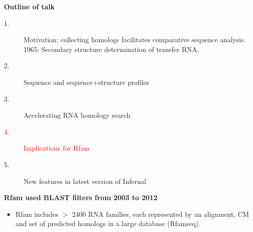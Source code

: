 \documentclass[landscape]{slides}
\begin{document}
\begin{slide}
\begin{center}
\textbf{Outline of talk}

\begin{description}
\item[1.] Motivation: collecting homologs facilitates comparative
  sequence analysis.\\ 1965: Secondary structure determination of
  transfer RNA.
\item[2.] Sequence and sequence+structure profiles
\item[3.] Accelerating RNA homology search
\item[\textcolor{red}{4.}] \textcolor{red}{Implications for Rfam}
\item[5.] New features in latest version of Infernal
\end{description}

\end{center}
\vfill
\end{slide}
\begin{slide}
\begin{center}

\textbf{Rfam used BLAST filters from 2003 to 2012}

\end{center}

\begin{itemize}
\item Rfam includes $>$ 2400 RNA families, each represented by an
  alignment, CM and set of predicted homologs in a large database (Rfamseq).
\end{itemize}


\vfill
\end{slide}
\end{document}
